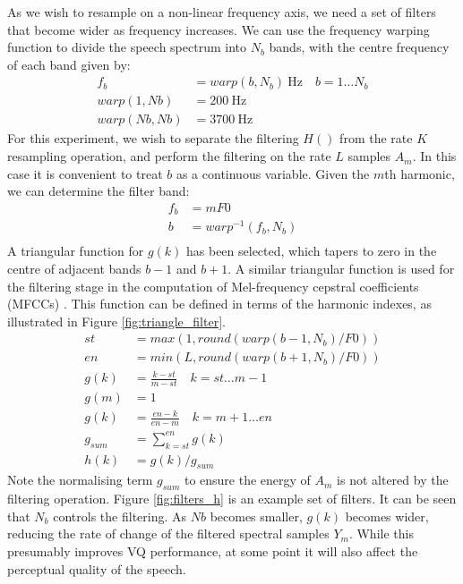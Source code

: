 \documentclass{article}
\begin{document}
As we wish to resample on a non-linear frequency axis, we need a set of filters that become wider as frequency increases. We can use the frequency warping function to divide the speech spectrum into $N_b$ bands, with the centre frequency of each band given by:
\begin{equation}
\begin{split}
f_b &= warp(b,N_b) \ \textrm{Hz} \quad b=1 \ldots N_b \\
warp(1,Nb) &= 200 \ \textrm{Hz} \\
warp(Nb,Nb) &= 3700 \ \textrm{Hz}
\end{split}
\end{equation}
For this experiment, we wish to separate the filtering $H()$ from the rate $K$ resampling operation, and perform the filtering on the rate $L$ samples $A_m$.  In this case it is convenient to treat $b$ as a continuous variable.  Given the $m$th harmonic, we can determine the filter band:
\begin{equation}
\begin{split}
f_b &= mF0 \\
b &= warp^{-1}(f_b,N_b) \\
\end{split}
\end{equation}
A triangular function for $g(k)$ has been selected, which tapers to zero in the centre of adjacent bands $b-1$ and $b+1$.  A similar triangular function is used for the filtering stage in the computation of Mel-frequency cepstral coefficients (MFCCs) \cite{davis1980comparison}. This function can be defined in terms of the harmonic indexes, as illustrated in  Figure \ref{fig:triangle_filter}.
\begin{equation}
\begin{split}
st &= max(1,round(warp(b-1,N_b)/F0)) \\
en &= min(L,round(warp(b+1,N_b)/F0)) \\
g(k) &= \frac{k-st}{m-st} \quad k=st \ldots m-1 \\
g(m) &= 1 \\
g(k) &= \frac{en-k}{en-m} \quad k=m+1 \ldots en \\
g_{sum} &= \sum_{k=st}^{en}g(k) \\
h(k) &= g(k)/g_{sum}
\end{split}
\end{equation}
Note the normalising term $g_{sum}$ to ensure the energy of $A_m$ is not altered by the filtering operation. Figure \ref{fig:filters_h} is an example set of filters. It can be seen that $N_b$ controls the filtering.  As $Nb$ becomes smaller, $g(k)$ becomes wider, reducing the rate of change of the filtered spectral samples $Y_m$.  While this presumably improves VQ performance, at some point it will also affect the perceptual quality of the speech.
\end{document}
